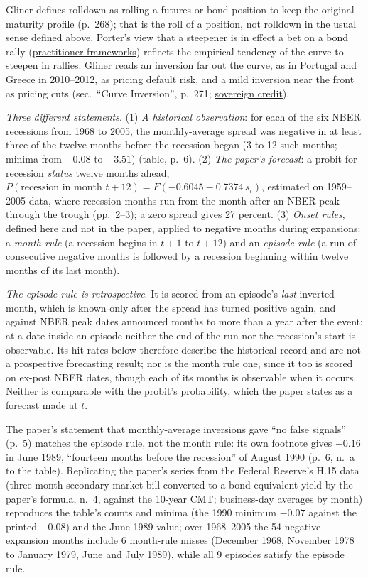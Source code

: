 \begin{qfmethod}
 Gliner defines rolldown as rolling a futures or bond position to keep the original maturity profile (p.~268); that is the roll of a position, not rolldown in the usual sense defined above. Porter's view that a steepener is in effect a bet on a bond rally (\hyperref[meth:macro-practitioner-frameworks]{practitioner frameworks}) reflects the empirical tendency of the curve to steepen in rallies. Gliner reads an inversion far out the curve, as in Portugal and Greece in 2010--2012, as pricing default risk, and a mild inversion near the front as pricing cuts (sec.\ ``Curve Inversion'', p.~271; \hyperref[def:sovereign-credit-defaults]{sovereign credit}).

 \emph{Three different statements}. (1) \emph{A historical observation}: for each of the six NBER recessions from 1968 to 2005, the monthly-average spread was negative in at least three of the twelve months before the recession began (3 to 12 such months; minima from $-0.08$ to $-3.51$) (table, p.~6). (2) \emph{The paper's forecast}: a probit for recession \emph{status} twelve months ahead, $P(\text{recession in month }t+12)=F(-0.6045-0.7374\,s_t)$, estimated on 1959--2005 data, where recession months run from the month after an NBER peak through the trough (pp.~2--3); a zero spread gives 27 percent. (3) \emph{Onset rules}, defined here and not in the paper, applied to negative months during expansions: a \emph{month rule} (a recession begins in $t+1$ to $t+12$) and an \emph{episode rule} (a run of consecutive negative months is followed by a recession beginning within twelve months of its last month).

\emph{The episode rule is retrospective}. It is scored from an episode's \emph{last} inverted month, which is known only after the spread has turned positive again, and against NBER peak dates announced months to more than a year after the event; at a date inside an episode neither the end of the run nor the recession's start is observable. Its hit rates below therefore describe the historical record and are not a prospective forecasting result; nor is the month rule one, since it too is scored on ex-post NBER dates, though each of its months is observable when it occurs. Neither is comparable with the probit's probability, which the paper states as a forecast made at $t$.

The paper's statement that monthly-average inversions gave ``no false signals'' (p.~5) matches the episode rule, not the month rule: its own footnote gives $-0.16$ in June 1989, ``fourteen months before the recession'' of August 1990 (p.~6, n.~a to the table). Replicating the paper's series from the Federal Reserve's H.15 data (three-month secondary-market bill converted to a bond-equivalent yield by the paper's formula, n.~4, against the 10-year CMT; business-day averages by month) \citep[H.15 data package, series RIFSGFSM03\_N.B and RIFLGFCY10\_N.B]{fed-h15-data} reproduces the table's counts and minima (the 1990 minimum $-0.07$ against the printed $-0.08$) and the June 1989 value; over 1968--2005 the 54 negative expansion months include 6 month-rule misses (December 1968, November 1978 to January 1979, June and July 1989), while all 9 episodes satisfy the episode rule.


\end{qfmethod}
